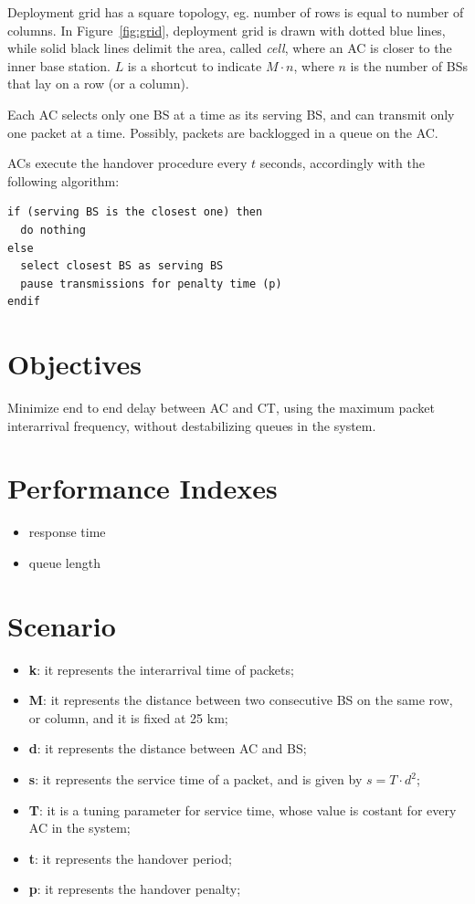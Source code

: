 \documentclass[a4paper,12pt]{article}
\begin{document}
Deployment grid has a square topology, eg. number of rows is equal to number of columns.
In Figure~\ref{fig:grid}, deployment grid is drawn with dotted blue lines, while solid black lines delimit the area, called \emph{cell}, where an AC is closer to the inner base station.
$L$ is a shortcut to indicate $M \cdot n$, where $n$ is the number of BSs that lay on a row (or a column).

Each AC selects only one BS at a time as its serving BS, and can transmit only one packet at a time.
Possibly, packets are backlogged in a queue on the AC.

ACs execute the handover procedure every $t$ seconds, accordingly with the following algorithm:
\begin{verbatim}
if (serving BS is the closest one) then
  do nothing
else
  select closest BS as serving BS
  pause transmissions for penalty time (p)
endif
\end{verbatim}

\section{Objectives}
Minimize end to end delay between AC and CT, using the maximum packet interarrival frequency, without destabilizing queues in the system.

\section{Performance Indexes}
\begin{itemize}
  \item response time
  \item queue length
\end{itemize}

\section{Scenario}
\begin{itemize}
  \item \textbf{k}: it represents the interarrival time of packets;
  \item \textbf{M}: it represents the distance between two consecutive BS on the same row, or column, and it is fixed at 25 km;
  \item \textbf{d}: it represents the distance between AC and BS;
  \item \textbf{s}: it represents the service time of a packet, and is given by $s = T \cdot d^{2}$;
  \item \textbf{T}: it is a tuning parameter for service time, whose value is costant for every AC in the system;
  \item \textbf{t}: it represents the handover period;
  \item \textbf{p}: it represents the handover penalty;
\end{itemize}
\end{document}
